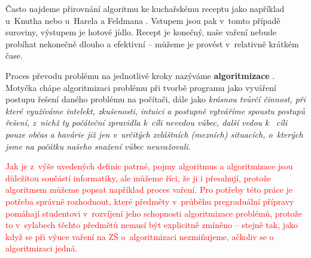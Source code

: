 \documentclass[FP,DP]{tulthesis}
\begin{document}
Často najdeme přirovnání algoritmu ke kuchařskému receptu jako například u~Knutha \citeyearpar[s.~6]{knuth} nebo u~Harela a Feldmana  \citeyearpar[s.~4]{spirit}. Vstupem jsou pak v~tomto případě suroviny, výstupem je hotové jídlo. Recept je konečný, naše vaření nebude probíhat nekonečně dlouho a efektivní -- můžeme je provést v~relativně krátkém čase.

 Proces převodu problému na jednotlivé kroky nazýváme \textbf{algoritmizace} \citep*[s.~67]{didaktikderinformatik}. Motyčka  \citeyearpar[s.~5]{motycka} chápe algoritmizaci problému při tvorbě programu jako  vyváření postupu řešení daného problému na počítači, dále jako \textit {krásnou tvůrčí činnost, při které využíváme intelekt, zkušenosti, intuici a postupně vytváříme spoustu postupů řešení, z~nichž ty počáteční zpravidla k~cíli nevedou vůbec, další vedou k ~cíli pouze občas a havárie již jen v~určitých zvláštních (mezních) situacích, o~kterých jsme na počátku našeho snažení vůbec neuvažovali}.

\textcolor{red}{Jak je z~výše uvedených definic patrné, pojmy algoritmus a algoritmizace jsou důležitou součástí informatiky, ale můžeme říci, že ji i přesahují, protože algoritmem můžeme popsat například proces vaření. Pro potřeby této práce je potřeba správně rozhodnout, které předměty v~průběhu pregraduální přípravy pomáhají studentovi v~rozvíjení jeho schopnosti algoritmizace problémů, protože to v~sylabech těchto předmětů nemusí být explicitně zmíněno -- stejně tak, jako když se při výuce vaření na ZŠ o~algoritmizaci nezmiňujeme, ačkoliv se o algoritmizaci jedná.  }



\end{document}
